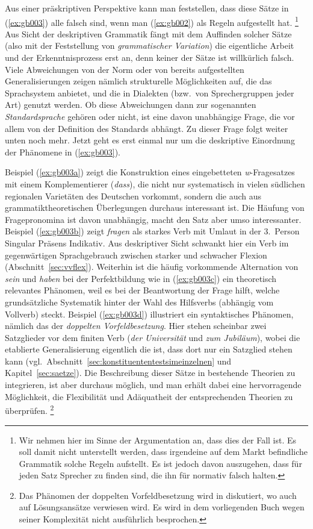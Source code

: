 Aus einer präskriptiven Perspektive kann man feststellen, dass diese Sätze in (\ref{ex:gb003}) alle falsch sind, wenn man (\ref{ex:gb002}) als Regeln aufgestellt hat.%
\footnote{Wir nehmen hier im Sinne der Argumentation an, dass dies der Fall ist.
Es soll damit nicht unterstellt werden, dass irgendeine auf dem Markt befindliche Grammatik solche Regeln aufstellt.
Es ist jedoch davon auszugehen, dass für jeden Satz Sprecher zu finden sind, die ihn für normativ falsch halten.}
Aus Sicht der deskriptiven Grammatik fängt mit dem Auffinden solcher Sätze (also mit der Feststellung von \textit{grammatischer Variation}) die eigentliche Arbeit und der Erkenntnisprozess erst an, denn keiner der Sätze ist willkürlich falsch.
Viele Abweichungen von der Norm oder von bereits aufgestellten Generalisierungen zeigen nämlich strukturelle Möglichkeiten auf, die das Sprachsystem anbietet, und die \zB in Dialekten (bzw.\ von Sprechergruppen jeder Art) genutzt werden.
Ob diese Abweichungen dann zur sogenannten \textit{Standardsprache} gehören oder nicht, ist eine davon unabhängige Frage, die vor allem von der Definition des Standards abhängt.
Zu dieser Frage folgt weiter unten noch mehr.
Jetzt geht es erst einmal nur um die deskriptive Einordnung der Phänomene in (\ref{ex:gb003}).

Beispiel (\ref{ex:gb003a}) zeigt die Konstruktion eines eingebetteten \textit{w}-Fragesatzes mit einem Komplementierer (\textit{dass}), die nicht nur systematisch in vielen südlichen regionalen Varietäten des Deutschen vorkommt, sondern die auch aus grammatiktheoretischen Überlegungen durchaus interessant ist.
Die Häufung von Fragepronomina ist davon unabhängig, macht den Satz aber umso interessanter.
Beispiel (\ref{ex:gb003b}) zeigt \textit{fragen} als starkes Verb mit Umlaut in der 3.\ Person Singular Präsens Indikativ.
Aus deskriptiver Sicht schwankt hier ein Verb im gegenwärtigen Sprachgebrauch zwischen starker und schwacher Flexion (Abschnitt~\ref{sec:vvflex}).
Weiterhin ist die häufig vorkommende Alternation von \textit{sein} und \textit{haben} bei der Perfektbildung wie in (\ref{ex:gb003c}) ein theoretisch relevantes Phänomen, weil es bei der Beantwortung der Frage hilft, welche grundsätzliche Systematik hinter der Wahl des Hilfsverbs (abhängig vom Vollverb) steckt.
Beispiel (\ref{ex:gb003d}) illustriert ein syntaktisches Phänomen, nämlich das der \textit{doppelten Vorfeldbesetzung}.
Hier stehen scheinbar zwei Satzglieder vor dem finiten Verb (\textit{der Universität} und \textit{zum Jubiläum}), wobei die etablierte Generalisierung eigentlich die ist, dass dort nur ein Satzglied stehen kann (vgl.\ Abschnitt~\ref{sec:konstituententestsimeinzelnen} und Kapitel~\ref{sec:saetze}).
Die Beschreibung dieser Sätze in bestehende Theorien zu integrieren, ist aber durchaus möglich, und man erhält dabei eine hervorragende Möglichkeit, die Flexibilität und Adäquatheit der entsprechenden Theorien zu überprüfen.%
\footnote{Das Phänomen der doppelten Vorfeldbesetzung wird in \citet{Mueller2003} diskutiert, wo auch auf Lösungsansätze verwiesen wird.
Es wird in dem vorliegenden Buch wegen seiner Komplexität nicht ausführlich besprochen.}


